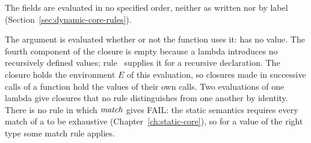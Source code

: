 \begin{rulecomments}
 The fields are evaluated in no specified order,
neither as written nor by label (Section~\ref{sec:dynamic-core-rules}). %
\end{rulecomments}



  {}

  {}

  {}

\begin{rulecomments}
 The argument is evaluated whether or not the
function uses it:  has no
value.
 The fourth component of the closure is empty
because a lambda introduces no recursively defined values;
rule~ supplies it for a recursive declaration. The
closure holds the environment $E$ of this evaluation, so closures made in
successive calls of a function hold the values of their own calls. Two
evaluations of one lambda give closures that no rule distinguishes from one
another by identity. %
 There is no rule in which $\mathit{match}$ gives FAIL: the
static semantics requires every match of a  to be exhaustive
(Chapter~\ref{ch:static-core}), so for a value of the right type some match
rule applies.
\end{rulecomments}

\label{sec:dynamic-core-apply}

  {}

  {}

  {}

